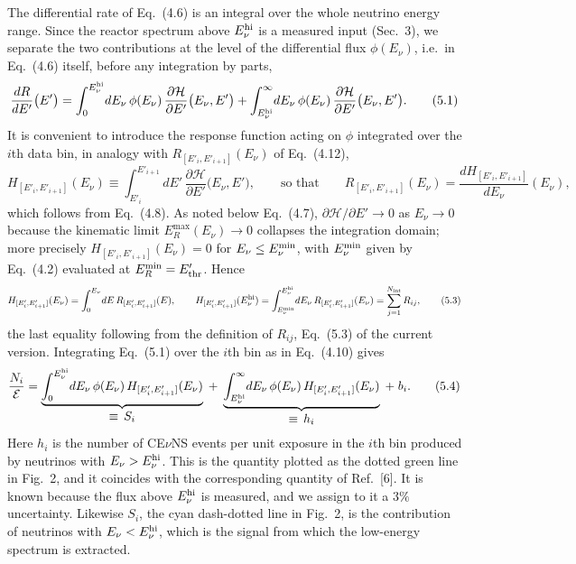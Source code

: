 \documentclass[11pt,a4paper]{article}
\newcommand{\Ev}{E_\nu}
\newcommand{\Ep}{E'}
\newcommand{\Ei}{E'_i}
\newcommand{\Eii}{E'_{i+1}}
\newcommand{\Etwo}{E_\nu^{\rm hi}}
\newcommand{\Emin}{E_\nu^{\rm min}}
\newcommand{\Hi}{H_{[\Ei,\Eii]}}
\newcommand{\Ri}{R_{[\Ei,\Eii]}}
\begin{document}
The differential rate of Eq.~(4.6) is an integral over the whole neutrino energy range.
Since the reactor spectrum above $\Etwo$ is a measured input (Sec.~3), we separate the two
contributions at the level of the differential flux $\phi(\Ev)$, i.e.\ in Eq.~(4.6) itself,
before any integration by parts,
\begin{equation}
\frac{dR}{d\Ep}\big(\Ep\big)
=\int_{0}^{\Etwo}\!d\Ev\,\phi(\Ev)\,\frac{\partial\mathcal H}{\partial \Ep}\big(\Ev,\Ep\big)
+\int_{\Etwo}^{\infty}\!d\Ev\,\phi(\Ev)\,\frac{\partial\mathcal H}{\partial \Ep}\big(\Ev,\Ep\big).
\tag{5.1}
\end{equation}
It is convenient to introduce the response function acting on $\phi$ integrated over the
$i$th data bin, in analogy with $\Ri(\Ev)$ of Eq.~(4.12),
\begin{equation}
\Hi(\Ev)\equiv\int_{\Ei}^{\Eii}\!d\Ep\,\frac{\partial\mathcal H}{\partial \Ep}\big(\Ev,\Ep\big),
\qquad\text{so that}\qquad
\Ri(\Ev)=\frac{d\Hi}{d\Ev}(\Ev),
\tag{5.2}
\end{equation}
which follows from Eq.~(4.8). As noted below Eq.~(4.7), $\partial\mathcal H/\partial\Ep\to0$ as
$\Ev\to0$ because the kinematic limit $E_R^{\max}(\Ev)\to0$ collapses the integration domain;
more precisely $\Hi(\Ev)=0$ for $\Ev\le\Emin$, with $\Emin$ given by Eq.~(4.2) evaluated at
$E_R^{\min}=E'_{\rm thr}$. Hence
\begin{equation}
\Hi(\Ev)=\int_0^{\Ev}\!dE\,\Ri(E),
\qquad
\Hi(\Etwo)=\int_{\Emin}^{\Etwo}\!d\Ev\,\Ri(\Ev)=\sum_{j=1}^{N_{\rm int}}R_{ij},
\tag{5.3}
\end{equation}
the last equality following from the definition of $R_{ij}$, Eq.~(5.3) of the current version.
Integrating Eq.~(5.1) over the $i$th bin as in Eq.~(4.10) gives
\begin{equation}
\frac{N_i}{\mathcal E}=\underbrace{\int_{0}^{\Etwo}\!d\Ev\,\phi(\Ev)\,\Hi(\Ev)}_{\textstyle \equiv\,S_i}
\;+\;\underbrace{\int_{\Etwo}^{\infty}\!d\Ev\,\phi(\Ev)\,\Hi(\Ev)}_{\textstyle \equiv\,h_i}\;+\;b_i .
\tag{5.4}
\end{equation}
Here $h_i$ is the number of CE$\nu$NS events per unit exposure in the $i$th bin produced by
neutrinos with $\Ev>\Etwo$. This is the quantity plotted as the dotted green line in Fig.~2,
and it coincides with the corresponding quantity of Ref.~[6]. It is known because the flux above
$\Etwo$ is measured, and we assign to it a $3\%$ uncertainty. Likewise $S_i$, the cyan
dash-dotted line in Fig.~2, is the contribution of neutrinos with $\Ev<\Etwo$, which is the
signal from which the low-energy spectrum is extracted.
\end{document}
